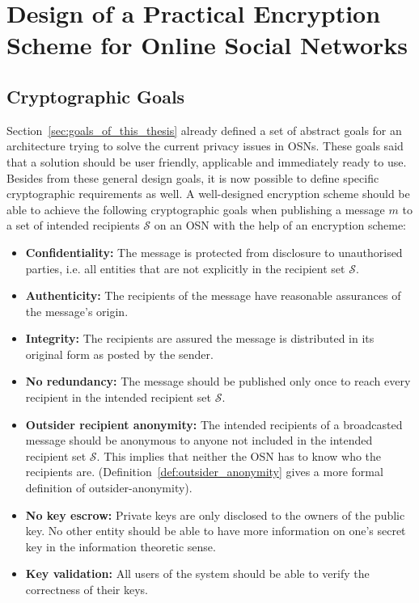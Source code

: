\chapter{Design of a Practical Encryption Scheme for Online Social Networks}
\label{cha:n}


\section{Cryptographic Goals}
Section~\ref{sec:goals_of_this_thesis} already defined a set of abstract goals for an architecture trying to solve the current privacy issues in OSNs. These goals said that a solution should be user friendly, applicable and immediately ready to use. Besides from these general design goals, it is now possible to define specific cryptographic requirements as well. A well-designed encryption scheme should be able to achieve the following cryptographic goals when publishing a message $m$ to a set of intended recipients $\mathcal{S}$ on an OSN with the help of an encryption scheme:
\begin{itemize}
 \item \textbf{Confidentiality:} The message is protected from disclosure to unauthorised parties, i.e. all entities that are not explicitly in the recipient set $\mathcal{S}$.
 \item \textbf{Authenticity:} The recipients of the message have reasonable assurances of the message's origin.
 \item \textbf{Integrity:} The recipients are assured the message is distributed in its original form as posted by the sender.
 \item \textbf{No redundancy:} The message should be published only once to reach every recipient in the intended recipient set $\mathcal{S}$.
 \item \textbf{Outsider recipient anonymity:} The intended recipients of a broadcasted message should be anonymous to anyone not included in the intended recipient set $\mathcal{S}$. This implies that neither the OSN has to know who the recipients are. (Definition~\ref{def:outsider_anonymity} gives a more formal definition of outsider-anonymity).
 \item \textbf{No key escrow:} Private keys are only disclosed to the owners of the public key. No other entity should be able to have more information on one's secret key in the information theoretic sense.
 \item \textbf{Key validation:} All users of the system should be able to verify the correctness of their keys.
\end{itemize}

